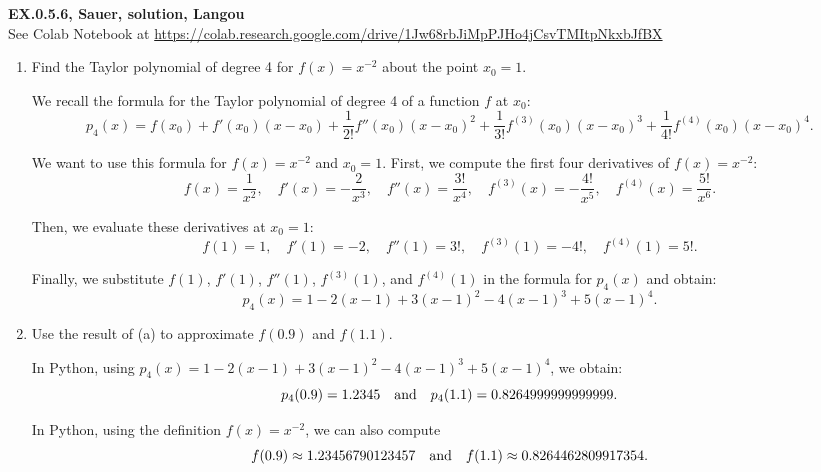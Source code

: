 \documentclass[pdftex,11pt]{article}
\begin{document}
\vspace*{.7cm}

\vspace*{.2cm}

\textbf{EX.0.5.6, Sauer, solution, Langou}\\

See Colab Notebook at \url{https://colab.research.google.com/drive/1Jw68rbJiMpPJHo4jCsvTMItpNkxbJfBX}

\renewcommand{\theenumi}{\alph{enumi}}
\begin{enumerate}\addtolength{\itemsep}{1.00\baselineskip}

\color{red}
\item
Find the Taylor polynomial of degree 4 for $f(x)=x^{-2}$ about the point $x_0=1$.\\
\color{black}

We recall the formula for the Taylor polynomial of degree 4 of a function $f$ at $x_0$:
$$p_4(x) = 
f(x_0) 
+ f'(x_0) (x-x_0)
+ \frac{1}{2!} f''(x_0) (x-x_0)^2
+ \frac{1}{3!} f^{(3)}(x_0) (x-x_0)^3
+ \frac{1}{4!} f^{(4)}(x_0) (x-x_0)^4.
$$

We want to use this formula for $f(x)=x^{-2}$ and $x_0=1$.
First, we compute the first four derivatives of $f(x)=x^{-2}$:
$$
f(x) = \frac{1}{x^2},\quad 
f'(x) = -\frac{2}{x^3},\quad 
f''(x) = \frac{3!}{x^4},\quad 
f^{(3)}(x) = -\frac{4!}{x^5},\quad 
f^{(4)}(x) = \frac{5!}{x^6}.
$$

Then, we evaluate these derivatives at $x_0=1$:
$$
f(1) = 1,\quad 
f'(1) = -2,\quad 
f''(1) = 3!,\quad 
f^{(3)}(1) = -4!,\quad 
f^{(4)}(1) = 5!.
$$

Finally, we substitute $f(1)$, $f'(1)$, $f''(1)$, $f^{(3)}(1)$, and
$f^{(4)}(1)$ in the formula for $p_4(x)$ and obtain:
$$
p_4(x) = 
1 - 2 (x-1) + 3 (x-1)^2 - 4 (x-1)^3 + 5 (x-1)^4.
$$

\color{red}\item
Use the result of (a) to approximate $f(0.9)$ and $f(1.1)$.\\
\color{black}

In Python, using $p_4(x)= 1 - 2 (x-1) + 3 (x-1)^2 - 4 (x-1)^3 + 5 (x-1)^4$, 
we obtain:
$$p_4(0.9) = 1.2345 \quad \textmd{and} \quad p_4(1.1) = 0.8264999999999999.$$

In Python, using the definition $f(x)=x^{-2}$, we can also compute
$$f(0.9) \approx 1.23456790123457 \quad \textmd{and} \quad f(1.1) \approx 0.8264462809917354.$$


\end{enumerate}
\end{document}
